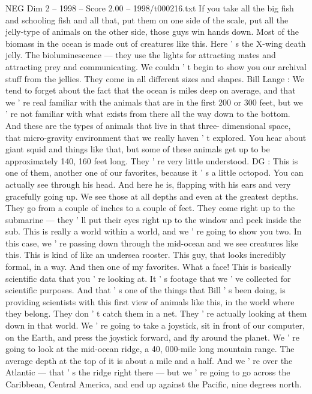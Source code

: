 \begin{textsample}{NEG Dim 2 – 1998 – Score 2.00 – 1998/t000216.txt}
If you take all the big fish and schooling fish and all that, put them on one side of the scale, put all the jelly-type of animals on the other side, those guys win hands down.
Most of the biomass in the ocean is made out of creatures like this.
Here ' s the X-wing death jelly.
The bioluminescence — they use the lights for attracting mates and attracting prey and communicating.
We couldn ' t begin to show you our archival stuff from the jellies.
They come in all different sizes and shapes.
Bill Lange : We tend to forget about the fact that the ocean is miles deep on average, and that we ' re real familiar with the animals that are in the first 200 or 300 feet, but we ' re not familiar with what exists from there all the way down to the bottom.
And these are the types of animals that live in that three- dimensional space, that micro-gravity environment that we really haven ' t explored.
You hear about giant squid and things like that, but some of these animals get up to be approximately 140, 160 feet long.
They ' re very little understood.
DG : This is one of them, another one of our favorites, because it ' s a little octopod.
You can actually see through his head.
And here he is, flapping with his ears and very gracefully going up.
We see those at all depths and even at the greatest depths.
They go from a couple of inches to a couple of feet.
They come right up to the submarine — they ' ll put their eyes right up to the window and peek inside the sub.
This is really a world within a world, and we ' re going to show you two.
In this case, we ' re passing down through the mid-ocean and we see creatures like this.
This is kind of like an undersea rooster.
This guy, that looks incredibly formal, in a way.
And then one of my favorites.
What a face!
This is basically scientific data that you ' re looking at.
It ' s footage that we ' ve collected for scientific purposes.
And that ' s one of the things that Bill ' s been doing, is providing scientists with this first view of animals like this, in the world where they belong.
They don ' t catch them in a net.
They ' re actually looking at them down in that world.
We ' re going to take a joystick, sit in front of our computer, on the Earth, and press the joystick forward, and fly around the planet.
We ' re going to look at the mid-ocean ridge, a 40, 000-mile long mountain range.
The average depth at the top of it is about a mile and a half.
And we ' re over the Atlantic — that ' s the ridge right there — but we ' re going to go across the Caribbean, Central America, and end up against the Pacific, nine degrees north.

\end{textsample}
